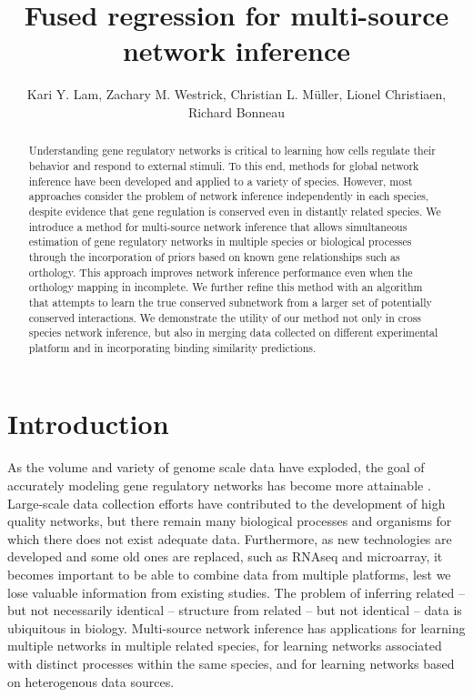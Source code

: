 \documentclass[11pt]{article}
\begin{document}
\title{Fused regression for multi-source network inference}
\author{Kari Y. Lam, Zachary M. Westrick, Christian L. M\"{u}ller, Lionel Christiaen, Richard Bonneau}
\maketitle

\begin{abstract}
Understanding gene regulatory networks is critical to learning how cells regulate their behavior and respond to external stimuli. To this end, methods for global network inference have been developed and applied to a variety of species. However, most approaches consider the problem of network inference independently in each species, despite evidence that gene regulation is conserved even in distantly related species. We introduce a method for multi-source network inference that allows simultaneous estimation of gene regulatory networks in multiple species or biological processes through the incorporation of priors based on known gene relationships such as orthology. This approach improves network inference performance even when the orthology mapping in incomplete. We further refine this method with an algorithm that attempts to learn the true conserved subnetwork from a larger set of potentially conserved interactions. We demonstrate the utility of our method not only in cross species network inference, but also in merging data collected on different experimental platform and in incorporating binding similarity predictions.
\end{abstract}

\section{Introduction}
As the volume and variety of genome scale data have exploded, the goal of accurately modeling gene regulatory networks has become more attainable \cite{bonneau_predictive_2007, ciofani_validated_2012, carro_transcriptional_2010}. Large-scale data collection efforts have contributed to the development of high quality networks, but there remain many biological processes and organisms for which there does not exist adequate data. Furthermore, as new technologies are developed and some old ones are replaced, such as RNAseq and microarray, it becomes important to be able to combine data from multiple platforms, lest we lose valuable information from existing studies. The problem of inferring related -- but not necessarily identical -- structure from related -- but not identical -- data is ubiquitous in biology. Multi-source network inference has applications for learning multiple networks in multiple related species, for learning networks associated with distinct processes within the same species, and for learning networks based on heterogenous data sources.
\end{document}
